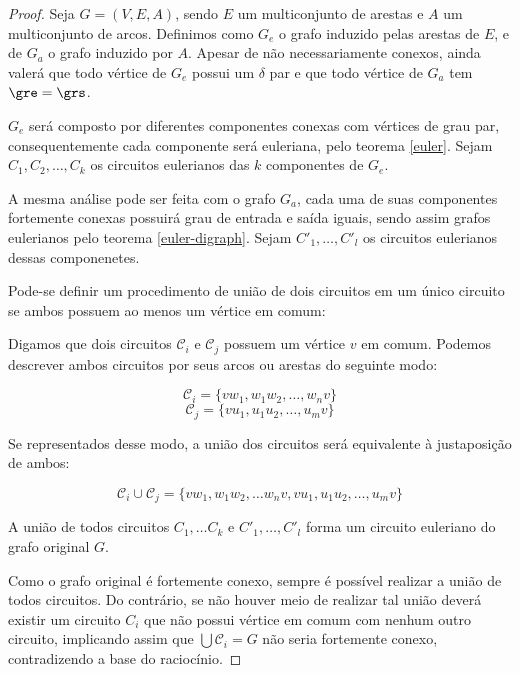     \begin{proof}
        Seja $G = (V, E, A)$, sendo $E$ um multiconjunto de arestas e $A$ um multiconjunto de arcos.
        Definimos como $G_e$ o grafo induzido pelas arestas de $E$, e de $G_a$ o grafo induzido por $A$.
        Apesar de não necessariamente conexos, ainda valerá que todo vértice de $G_e$ possui um $\delta$ par e que todo vértice de $G_a$ tem $\gre = \grs$.
        
        $G_e$ será composto por diferentes componentes conexas com vértices de grau par, consequentemente cada componente será euleriana, pelo teorema \ref{euler}.
        Sejam $C_1, C_2, \dots, C_k$  os circuitos eulerianos das $k$ componentes de $G_e$.

        A mesma análise pode ser feita com o grafo $G_a$, cada uma de suas componentes fortemente conexas possuirá grau de entrada e saída iguais, sendo assim grafos eulerianos pelo teorema \ref{euler-digraph}. 
        Sejam $C'_1, \dots, C'_l$ os circuitos eulerianos dessas componenetes.

        Pode-se definir um procedimento de união de dois circuitos em um único circuito se ambos possuem ao menos um vértice em comum:
        
        Digamos que dois circuitos $\mathcal{C}_i$ e $\mathcal{C}_j$ possuem um vértice $v$ em comum.
        Podemos descrever ambos circuitos por seus arcos ou arestas do seguinte modo:

        \[
            \mathcal{C}_i = \{ vw_1, w_1w_2, \dots, w_nv \}
        \]
        \[
            \mathcal{C}_j = \{ vu_1, u_1u_2, \dots, u_mv \}
        \]

        Se representados desse modo, a união dos circuitos será equivalente à justaposição de ambos:

        \[
            \mathcal{C}_i \cup \mathcal{C}_j = \{ vw_1, w_1w_2, \dots w_nv, vu_1, u_1u_2, \dots, u_mv \}
        \]
        
        A união de todos circuitos $C_1, \dots C_k$ e $C'_1, \dots, C'_l$ forma um circuito euleriano do grafo original $G$.

        Como o grafo original é fortemente conexo, sempre é possível realizar a união de todos circuitos.
    Do contrário, se não houver meio de realizar tal união deverá existir um circuito $C_i$ que não possui vértice em comum com nenhum outro circuito, implicando assim que $\bigcup \mathcal{C}_i = G$ não seria fortemente conexo, contradizendo a base do raciocínio.
    \end{proof}


